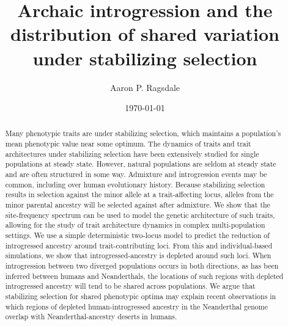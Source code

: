 \documentclass{article}
\title{Archaic introgression and the distribution
of shared variation under stabilizing selection}
\author[]{Aaron P. Ragsdale}
\affil[]{apragsdale@wisc.edu}
\affil[]{Department of Integrative Biology, University of Wisconsin--Madison, WI 53706}
\date{\today}
\begin{document}
\maketitle

\begin{abstract}

    \noindent Many phenotypic traits are under stabilizing selection, which
    maintains a population's mean phenotypic value near some optimum. The
    dynamics of traits and trait architectures under stabilizing selection have
    been extensively studied for single populations at steady state. However,
    natural populations are seldom at steady state and are often structured in
    some way. Admixture and introgression events may be common, including over
    human evolutionary history. Because stabilizing selection results in
    selection against the minor allele at a trait-affecting locus, alleles from
    the minor parental ancestry will be selected against after admixture. We
    show that the site-frequency spectrum can be used to model the genetic
    architecture of such traits, allowing for the study of trait architecture
    dynamics in complex multi-population settings. We use a simple
    deterministic two-locus model to predict the reduction of introgressed
    ancestry around trait-contributing loci. From this and individual-based
    simulations, we show that introgressed-ancestry is depleted around such
    loci. When introgression between two diverged populations occurs in both
    directions, as has been inferred between humans and Neanderthals, the
    locations of such regions with depleted introgressed ancestry will tend to
    be shared across populations. We argue that stabilizing selection for
    shared phenotypic optima may explain recent observations in which regions
    of depleted human-introgressed ancestry in the Neanderthal genome overlap
    with Neanderthal-ancestry deserts in humans.

\end{abstract}
\end{document}
